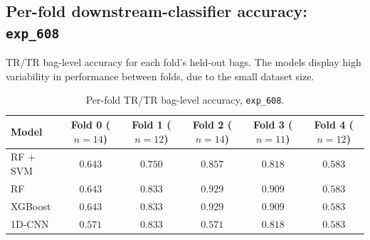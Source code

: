 





\subsection*{Per-fold downstream-classifier accuracy: \texttt{exp\_608}}

TR/TR bag-level accuracy for each fold's held-out bags. The models display high variability in performance between folds, due to the small dataset size.

\begin{table}[H]
\centering
\scriptsize
\begin{tabular*}{\textwidth}{@{\extracolsep{\fill}}lccccc}
\toprule
Model & Fold 0 ($n{=}14$) & Fold 1 ($n{=}12$) & Fold 2 ($n{=}14$) & Fold 3 ($n{=}11$) & Fold 4 ($n{=}12$) \\
\midrule
RF + SVM & $0.643$ & $0.750$ & $0.857$ & $0.818$ & $0.583$ \\
RF & $0.643$ & $0.833$ & $0.929$ & $0.909$ & $0.583$ \\
XGBoost & $0.643$ & $0.833$ & $0.929$ & $0.909$ & $0.583$ \\
1D-CNN & $0.571$ & $0.833$ & $0.571$ & $0.818$ & $0.583$ \\
\bottomrule
\end{tabular*}
\caption{Per-fold TR/TR bag-level accuracy, \texttt{exp\_608}.}
\label{tab:ctrl_fold_accuracy}

\end{table}